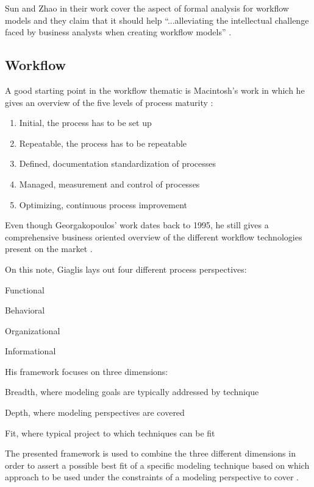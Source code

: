 \documentclass{seal_thesis}
\begin{document}
Sun and Zhao in their work cover the aspect of formal analysis for workflow models and they claim that it should help ``...alleviating the intellectual challenge faced by business analysts when creating workflow models'' \cite{Sun2013}.

\subsection{Workflow}
\label{subsec:workflow}

A good starting point in the workflow thematic is Macintosh's work in which he gives an overview of the five levels of process maturity \cite{Macintosh1993}:

\begin{enumerate}
	\item Initial, the process has to be set up
	\item Repeatable, the process has to be repeatable
	\item Defined, documentation standardization of processes
	\item Managed, measurement and control of processes
	\item Optimizing, continuous process improvement
\end{enumerate}

Even though Georgakopoulos' work dates back to 1995, he still gives a comprehensive business oriented overview of the different workflow technologies present on the market \cite{Georgakopoulos1995}. 

On this note, Giaglis lays out four different process perspectives:
\begin{enumerate*}
	\item Functional
	\item Behavioral
	\item Organizational
	\item Informational
\end{enumerate*}

His framework focuses on three dimensions:
\begin{enumerate*}
	\item Breadth, where modeling goals are typically addressed by technique
	\item Depth, where modeling perspectives are covered
	\item Fit, where typical project to which techniques can be fit
\end{enumerate*}

The presented framework is used to combine the three different dimensions in order to assert a possible best fit of a specific modeling technique based on which approach to be used under the constraints of a modeling perspective to cover \cite{Giaglis2001}.
\end{document}
